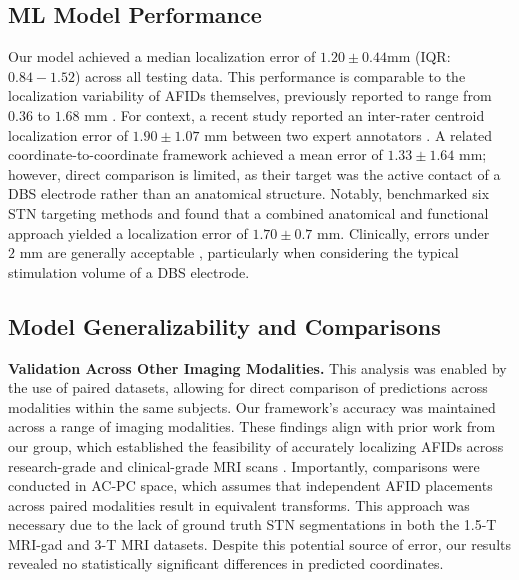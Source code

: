 \subsection{ML Model Performance}
Our model achieved a median localization error of \( 1.20 \pm 0.44\text{mm} \) (IQR: \( 0.84 - 1.52 \)) across all testing data. This performance is comparable to the localization variability of AFIDs themselves, previously reported to range from \( 0.36 \) to \( 1.68 \text{ mm} \) \cite{Lau2019-eh}. For context, a recent study reported an inter-rater centroid localization error of \( 1.90 \pm 1.07 \text{ mm} \) between two expert annotators \cite{Miller2023-ct}. A related coordinate-to-coordinate framework \cite{Engelhardt2021-zd} achieved a mean error of \( 1.33 \pm 1.64 \text{ mm} \); however, direct comparison is limited, as their target was the active contact of a DBS electrode rather than an anatomical structure. Notably, \cite{Guo2007-nf} benchmarked six STN targeting methods and found that a combined anatomical and functional approach yielded a localization error of \( 1.70 \pm 0.7 \text{ mm} \). Clinically, errors under \( 2 \text{ mm} \) are generally acceptable \cite{Kremer2023-if}, particularly when considering the typical stimulation volume of a DBS electrode.

\subsection{Model Generalizability and Comparisons}
\textbf{Validation Across Other Imaging Modalities.} This analysis was enabled by the use of paired datasets, allowing for direct comparison of predictions across modalities within the same subjects. Our framework’s accuracy was maintained across a range of imaging modalities. These findings align with prior work from our group, which established the feasibility of accurately localizing AFIDs across research-grade and clinical-grade MRI scans \cite{Taha2023-gd}. Importantly, comparisons were conducted in AC-PC space, which assumes that independent AFID placements across paired modalities result in equivalent transforms. This approach was necessary due to the lack of ground truth STN segmentations in both the 1.5-T MRI-gad and 3-T MRI datasets. Despite this potential source of error, our results revealed no statistically significant differences in predicted coordinates.

